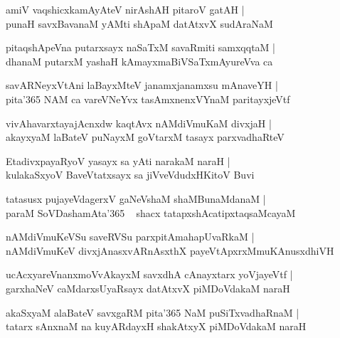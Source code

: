 \documentclass[twoside,12pt,openright]{book}
\newcounter{shloka}[chapter]
\begin{document}
\begin{shloka}%
amiV vaqshicxkamAyAteV nirAshAH pitaroV gatAH |\\
punaH savxBavanaM yAMti shApaM datAtxvX sudAraNaM 
\end{shloka}

\begin{shloka}%
pitaqshApeVna putarxsayx naSaTxM savaRmiti samxqqtaM |\\
dhanaM putarxM yashaH kAmayxmaBiVSaTxmAyureVva ca 
\end{shloka}

\begin{shloka}%
savARNeyxVtAni laBayxMteV janamxjanamxsu mAnaveYH |\\
pita\char'365 NAM ca vareVNeYvx tasAmxnenxVYnaM paritayxjeVtf
\end{shloka}

\begin{shloka}%
vivAhavarxtayajAcnxdw kaqtAvx nAMdiVmuKaM divxjaH |\\
akayxyaM laBateV puNayxM goVtarxM tasayx parxvadhaRteV 
\end{shloka}

\begin{shloka}%
EtadivxpayaRyoV yasayx sa yAti narakaM naraH |\\
kulakaSxyoV BaveVtatxsayx sa jiVveVdudxHKitoV Buvi
\end{shloka}

\begin{shloka}%
tatasusx pujayeVdagerxV gaNeVshaM shaMBunaMdanaM |\\
paraM SoVDashamAta\char'365 ~ shacx tatapxshAcatipxtaqsaMcayaM 
\end{shloka}

\begin{shloka}%
nAMdiVmuKeVSu saveRVSu parxpitAmahapUvaRkaM |\\
nAMdiVmuKeV divxjAnasxvARnAsxthX payeVtApxrxMmuKAnusxdhiVH
\end{shloka}

\begin{shloka}%
ucAcxyareVnanxmoVvAkayxM savxdhA cAnayxtarx yoVjayeVtf |\\
garxhaNeV caMdarxsUyaRsayx datAtxvX piMDoVdakaM naraH
\end{shloka}

\begin{shloka}%
akaSxyaM alaBateV savxgaRM pita\char'365 NaM puSiTxvadhaRnaM |\\
tatarx sAnxnaM na kuyARdayxH shakAtxyX piMDoVdakaM naraH 
\end{shloka}
\end{document}
